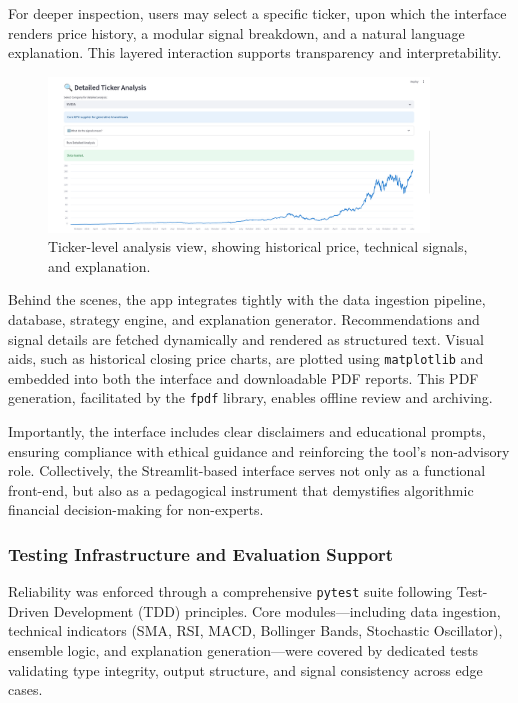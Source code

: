 For deeper inspection, users may select a specific ticker, upon which the interface renders price history, a modular signal breakdown, and a natural language explanation. This layered interaction supports transparency and interpretability.

\begin{figure}[ht]
    \centering
    \includegraphics[width=0.9\textwidth]{assets/ui2-ticker_analysis.png}
    \caption{\small Ticker-level analysis view, showing historical price, technical signals, and explanation.}
    \label{fig:ui-ticker-analysis}
\end{figure}

Behind the scenes, the app integrates tightly with the data ingestion pipeline, database, strategy engine, and explanation generator. Recommendations and signal details are fetched dynamically and rendered as structured text. Visual aids, such as historical closing price charts, are plotted using \texttt{matplotlib} and embedded into both the interface and downloadable PDF reports. This PDF generation, facilitated by the \texttt{fpdf} library, enables offline review and archiving.

Importantly, the interface includes clear disclaimers and educational prompts, ensuring compliance with ethical guidance and reinforcing the tool’s non-advisory role. Collectively, the Streamlit-based interface serves not only as a functional front-end, but also as a pedagogical instrument that demystifies algorithmic financial decision-making for non-experts.


\subsubsection{Testing Infrastructure and Evaluation Support}

Reliability was enforced through a comprehensive \texttt{pytest} suite following Test-Driven Development (TDD) principles. Core modules—including data ingestion, technical indicators (SMA, RSI, MACD, Bollinger Bands, Stochastic Oscillator), ensemble logic, and explanation generation—were covered by dedicated tests validating type integrity, output structure, and signal consistency across edge cases.

